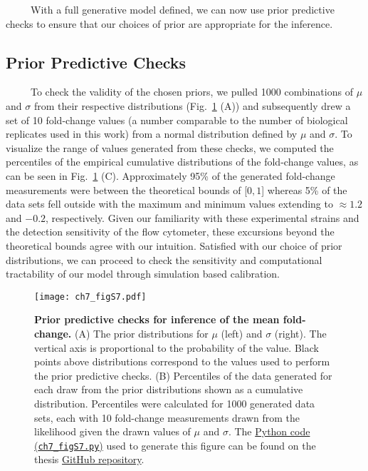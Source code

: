 \documentclass[12pt]{caltech_thesis}
\begin{document}
~~~~~With a full generative model defined, we can now use prior
predictive checks to ensure that our choices of prior are appropriate
for the inference.

\hypertarget{prior-predictive-checks-1}{%
\subsection{Prior Predictive Checks}\label{prior-predictive-checks-1}}

~~~~~To check the validity of the chosen priors, we pulled 1000
combinations of \(\mu\) and \(\sigma\) from their respective
distributions (Fig.~\ref{fig:empirical_F_prior_pred} (A)) and
subsequently drew a set of 10 fold-change values (a number comparable to
the number of biological replicates used in this work) from a normal
distribution defined by \(\mu\) and \(\sigma\). To visualize the range
of values generated from these checks, we computed the percentiles of
the empirical cumulative distributions of the fold-change values, as can
be seen in Fig.~\ref{fig:empirical_F_prior_pred} (C). Approximately 95\%
of the generated fold-change measurements were between the theoretical
bounds of {[}\(0, 1\){]} whereas 5\% of the data sets fell outside with
the maximum and minimum values extending to \(\approx 1.2\) and
\(-0.2\), respectively. Given our familiarity with these experimental
strains and the detection sensitivity of the flow cytometer, these
excursions beyond the theoretical bounds agree with our intuition.
Satisfied with our choice of prior distributions, we can proceed to
check the sensitivity and computational tractability of our model
through simulation based calibration.

\hypertarget{fig:empirical_F_prior_pred}{%
\begin{figure}
\centering
\texttt{[image: ch7\_figS7.pdf]}
\caption[{Prior predictive checks for inference of the mean
fold-change}]{\textbf{Prior predictive checks for inference of the mean
fold-change.} (A) The prior distributions for \(\mu\) (left) and
\(\sigma\) (right). The vertical axis is proportional to the probability
of the value. Black points above distributions correspond to the values
used to perform the prior predictive checks. (B) Percentiles of the data
generated for each draw from the prior distributions shown as a
cumulative distribution. Percentiles were calculated for 1000 generated
data sets, each with 10 fold-change measurements drawn from the
likelihood given the drawn values of \(\mu\) and \(\sigma\). The
\href{https://github.com/gchure/phd/blob/master/src/chapter_07/code/ch7_figS7.py}{Python
code (\texttt{ch7\_figS7.py})} used to generate this figure can be found
on the thesis \href{https://github.com/gchure/phd}{GitHub repository}.}
\label{fig:empirical_F_prior_pred}
\end{figure}
}
\end{document}
